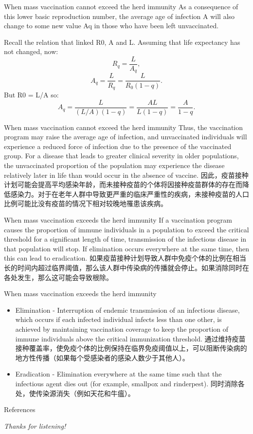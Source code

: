 \documentclass[
  notheorems,
  aspectratio=54,
]{beamer}
\begin{document}
\begin{frame}{When mass vaccination cannot exceed the herd immunity}
  As a consequence of this lower basic reproduction number, the average age of infection A will also change to some new value Aq in those who have been left unvaccinated.

Recall the relation that linked R0, A and L. Assuming that life expectancy has not changed, now:
$${\displaystyle R_{q}={\frac {L}{A_{q}}},}$$
$${\displaystyle A_{q}={\frac {L}{R_{q}}}={\frac {L}{R_{0}(1-q)}}.}$$
But R0 = L/A so:
$${\displaystyle A_{q}={\frac {L}{(L/A)(1-q)}}={\frac {AL}{L(1-q)}}={\frac {A}{1-q}}.}$$
\end{frame}

\begin{frame}{When mass vaccination cannot exceed the herd immunity}
Thus, the vaccination program may raise the average age of infection, and unvaccinated individuals will experience a reduced force of infection due to the presence of the vaccinated group. For a disease that leads to greater clinical severity in older populations, the unvaccinated proportion of the population may experience the disease relatively later in life than would occur in the absence of vaccine. 因此，疫苗接种计划可能会提高平均感染年龄，而未接种疫苗的个体将因接种疫苗群体的存在而降低感染力。对于在老年人群中导致更严重的临床严重性的疾病，未接种疫苗的人口比例可能比没有疫苗的情况下相对较晚地罹患该疾病。
\end{frame}

\begin{frame}{When mass vaccination exceeds the herd immunity}
  If a vaccination program causes the proportion of immune individuals in a population to exceed the critical threshold for a significant length of time, transmission of the infectious disease in that population will stop. If elimination occurs everywhere at the same time, then this can lead to eradication. 如果疫苗接种计划导致人群中免疫个体的比例在相当长的时间内超过临界阈值，那么该人群中传染病的传播就会停止。如果消除同时在各处发生，那么这可能会导致根除。
\end{frame}

\begin{frame}{When mass vaccination exceeds the herd immunity}
  \begin{itemize}
    \item Elimination - 
      Interruption of endemic transmission of an infectious disease, which occurs if each infected individual infects less than one other, is achieved by maintaining vaccination coverage to keep the proportion of immune individuals above the critical immunization threshold. 通过维持疫苗接种覆盖率，使免疫个体的比例保持在临界免疫阈值以上，可以阻断传染病的地方性传播（如果每个受感染者的感染人数少于其他人）。
    \item Eradication - 
      Elimination everywhere at the same time such that the infectious agent dies out (for example, smallpox and rinderpest). 同时消除各处，使传染源消失（例如天花和牛瘟）。
  \end{itemize}
\end{frame}

\nocite{*}
\begin{frame}{References}
    \printbibliography
\end{frame}

\begin{frame}{}
  \centering \Huge
  \emph{Thanks for listening!}
\end{frame}
\end{document}
